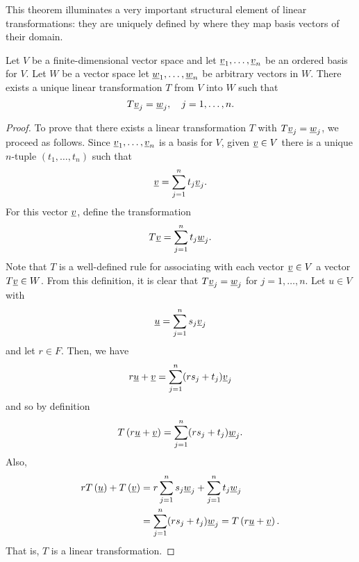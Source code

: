 This theorem illuminates a very important structural element of linear transformations: they are uniquely defined by where they map basis vectors of their domain.

\iffalse
\begin{theorem} \label{theorem:UniqueLinearTransformation}
Let $V$ be a finite-dimensional vector space and let $\underline{v}_1, \ldots, \underline{v}_n$ be an ordered basis for $V$.
Let $W$ be a vector space let $\underline{w}_1, \ldots, \underline{w}_n$ be arbitrary vectors in $W$.
There exists a unique linear transformation $T$ from $V$ into $W$ such that
\begin{equation*}
T \underline{v}_j = \underline{w}_j, \quad j= 1, \ldots, n.
\end{equation*}
\end{theorem}
\begin{proof}
To prove that there exists a linear transformation $T$ with $T \underline{v}_j = \underline{w}_j$, we proceed as follows.
Since $\underline{v}_1, \ldots, \underline{v}_n$ is a basis for $V$, given $\underline{v} \in V$ there is a unique $n$-tuple $(t_1, \ldots, t_n)$ such that
\begin{equation*}
\underline{v} = \sum_{j=1}^n t_j \underline{v}_j .
\end{equation*}
For this vector $\underline{v}$, define the transformation
\begin{equation*}
T \underline{v} = \sum_{j=1}^n t_j \underline{w}_j .
\end{equation*}
Note that $T$ is a well-defined rule for associating with each vector $\underline{v} \in V$ a vector $T\underline{v} \in W$.
From this definition, it is clear that $T \underline{v}_j = \underline{w}_j$ for $j = 1, \ldots, n$.
Let $u \in V$ with
\begin{equation*}
\underline{u} = \sum_{j=1}^n s_j \underline{v}_j
\end{equation*}
and let $r \in F$.
Then, we have
\begin{equation*}
r \underline{u} + \underline{v} = \sum_{j=1}^n (r s_j + t_j) \underline{v}_j
\end{equation*}
and so by definition
\begin{equation*}
T \left( r \underline{u} + \underline{v} \right)
= \sum_{j=1}^n (r s_j + t_j) \underline{w}_j .
\end{equation*}
Also,
\begin{equation*}
\begin{split}
r T \left( \underline{u} \right) + T \left( \underline{v} \right)
&= r \sum_{j=1}^n s_j \underline{w}_j
+ \sum_{j=1}^n t_j \underline{w}_j \\
&= \sum_{j=1}^n (r s_j + t_j) \underline{w}_j
= T \left( r \underline{u} + \underline{v} \right) .
\end{split}
\end{equation*}
That is, $T$ is a linear transformation.


\end{proof}
